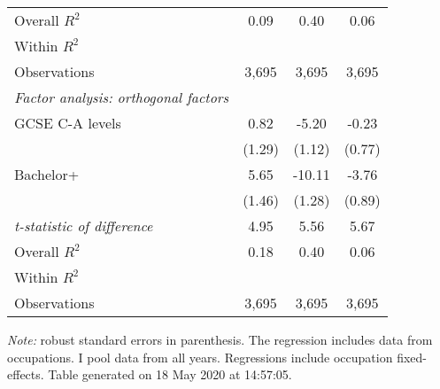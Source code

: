 \begin{center}
\begin{threeparttable}[!h]
\begin{tabular}{lccc}
\midrule Overall $ R^2$&        0.09         &        0.40         &        0.06         \\
Within $ R^2$       &                     &                     &                     \\
Observations        &       3,695         &       3,695         &       3,695         \\
\midrule \vspace{1mm}\textit{Factor analysis: orthogonal factors} \\ 
\hspace{3mm}GCSE C-A levels&        0.82         &       -5.20\sym{***}&       -0.23         \\
                    &      (1.29)         &      (1.12)         &      (0.77)         \\
\hspace{3mm}Bachelor+&        5.65\sym{***}&      -10.11\sym{***}&       -3.76\sym{***}\\
                    &      (1.46)         &      (1.28)         &      (0.89)         \\
\textit{t-statistic of difference}&        4.95         &        5.56         &        5.67         \\
\midrule Overall $ R^2$&        0.18         &        0.40         &        0.06         \\
Within $ R^2$       &                     &                     &                     \\
Observations        &       3,695         &       3,695         &       3,695         \\
\bottomrule
\bottomrule
\end{tabular}
\begin{tablenotes}
\item \footnotesize \textit{Note:} robust standard errors in parenthesis. The regression includes data from occupations. I pool data from all years. Regressions include occupation fixed-effects. Table generated on 18 May 2020 at 14:57:05.
\end{tablenotes}
\end{threeparttable}
\end{center}
